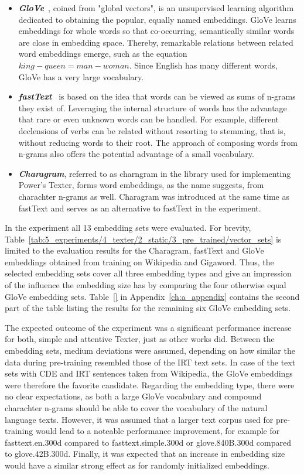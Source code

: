 \begin{itemize}
    \item \textbf{\emph{GloVe}}~\cite{Pennington2014GloveGV}, coined from "global vectors", is an unsupervised learning algorithm dedicated to obtaining the popular, equally named embeddings. GloVe learns embeddings for whole words so that co-occurring, semantically similar words are close in embedding space. Thereby, remarkable relations between related word embeddings emerge, such as the equation $king - queen = man - woman$. Since English has many different words, GloVe has a very large vocabulary.

    \item \textbf{\emph{fastText}}~\cite{Bojanowski2017EnrichingWV,Mikolov2018AdvancesIP}  is based on the idea that words can be viewed as sums of n-grams they exist of. Leveraging the internal structure of words has the advantage that rare or even unknown words can be handled. For example, different declensions of verbs can be related without resorting to stemming, that is, without reducing words to their root. The approach of composing words from n-grams also offers the potential advantage of a small vocabulary.

    \item \textbf{\emph{Charagram}}, referred to as charngram in the library used for implementing Power's Texter, forms word embeddings, as the name suggests, from charachter n-grams as well. Charagram was introduced at the same time as fastText and serves as an alternative to fastText in the experiment.
\end{itemize}

In the experiment all 13 embedding sets were evaluated. For brevity, Table~\ref{tab:5_experiments/4_texter/2_static/3_pre_trained/vector_sets} is limited to the evaluation results for the Charagram, fastText and GloVe embeddings obtained from training on Wikipedia and Gigaword. Thus, the selected embedding sets cover all three embedding types and give an impression of the influence the embedding size has by comparing the four otherwise equal GloVe embedding sets. Table~\ref{} in Appendix~\ref{ch:a_appendix} contains the second part of the table listing the results for the remaining six GloVe embedding sets.

The expected outcome of the experiment was a significant performance increase for both, simple and attentive Texter, just as other works did. Between the embedding sets, medium deviations were assumed, depending on how similar the data during pre-training resembled those of the IRT text sets. In case of the text sets with CDE and IRT sentences taken from Wikipedia, the GloVe embeddings were therefore the favorite candidate. Regarding the embedding type, there were no clear expectations, as both a large GloVe vocabulary and compound charachter n-grams should be able to cover the vocabulary of the natural language texts. However, it was assumed that a larger text corpus used for pre-training would lead to a noteable performance improvement, for example for fasttext.en.300d compared to fasttext.simple.300d or glove.840B.300d compared to glove.42B.300d. Finally, it was expected that an increase in embedding size would have a similar strong effect as for randomly initialized embeddings.

